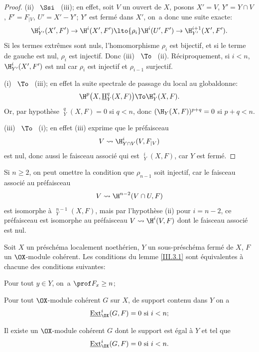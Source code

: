 \skpt

\begin{proof}
(ii) ~$\Ssi$~ (iii); en effet, soit $V$ un ouvert de $X$, posons $X'=V$, $Y'=Y\cap V$, $F'=F_{\mid V}$, $U'=X'- Y'$; $Y'$ est ferm\'e dans $X'$, on~a donc une suite exacte:
\[
\H_{Y'}^i(X', F') \to \H^i(X', F') \lto{\rho_i} \H^i(U', F') \to \H_{Y'}^{i+1}(X', F').
\]
Si les termes extr\^emes sont nuls, l'homomorphisme $\rho_i$ est bijectif, et si le terme de gauche est nul, $\rho_i$ est injectif. Donc (iii) ~$\To$~ (ii). R\'eciproquement, si $i<n$, $\H_{Y'}^i(X', F')$ est nul car $\rho_i$ est injectif et $\rho_{i-1}$ surjectif.

(i) ~$\To$~ (iii); en effet la suite spectrale \og de passage du local au global\fg donne:
\[
\H^p\bigl(X, \mathop{\underline{\mathrm{H}}}\nolimits_Y^q(X, F)\bigr) \To \H_Y^*(X, F).
\]
Or, par hypoth\`ese $\mathop{\underline{\mathrm{H}}}\nolimits_Y^q(X, F) =0$ si $q<n$, donc $(\H_Y (X, F))^{p+q} = 0$ si $p+q<n$.

(iii) ~$\To$~ (i); en effet (iii) exprime que le pr\'efaisceau
\[
V \rightsquigarrow \H_{Y\cap V}^i(V, F_{\mid V})
\]
est nul, donc aussi le faisceau associ\'e qui est $\mathop{\underline{\mathrm{H}}}\nolimits_Y^i (X, F)$, car $Y$ est ferm\'e.
\skipqed
\end{proof}

\begin{remarque} \label{III.3.2}
 Si $n\geq 2$, on peut omettre la condition que $\rho_{n-1}$ soit injectif, car le faisceau associ\'e au pr\'efaisceau
\[
V \rightsquigarrow \H^{n-2}(V\cap U, F)
\]
est isomorphe \`a $\mathop{\underline{\mathrm{H}}}\nolimits_Y^{n-1} (X, F)$, mais par l'hypoth\`ese (ii) pour $i=n-2$, ce pr\'efaisceau est isomorphe au pr\'efaisceau $V \rightsquigarrow \H^i(V, F)$ dont le faisceau associ\'e est nul.
\end{remarque}

\begin{proposition} \label{III.3.3}
Soit $X$ un pr\'esch\'ema localement noeth\'erien, $Y$ un sous-pr\'esch\'ema ferm\'e de $X$, $F$ un $\OX$-module coh\'erent. Les conditions du lemme \ref{III.3.1} sont \'equivalentes \`a chacune des conditions suivantes:
\begin{enumeratei}
\setcounter{enumi}{3}
\item
Pour tout $y\in Y$, on~a $\prof F_x \geq n$;

\item
Pour tout $\OX$-module coh\'erent $G$ sur $X$, de support contenu dans $Y$ on a
\[
\mathop{\underline{\mathrm{Ext}}}\nolimits_{\OX}^i(G, F)=0 \text{ si } i<n;
\]

\item
Il existe un $\OX$-module coh\'erent $G$ dont le support est \'egal \`a $Y$ et tel que
\[
\mathop{\underline{\mathrm{Ext}}}\nolimits_{\OX}^i(G, F)=0 \text{ si } i<n.
\]
\end{enumeratei}
\end{proposition}

